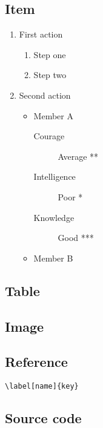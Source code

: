 \documentclass{article}
\begin{document}
\subsection{Item}
\begin{enumerate}
  \item First action
  \begin{enumerate}
    \item Step one
    \item Step two
  \end{enumerate}
  \item Second action
  \begin{itemize}
    \item Member A
    \begin{description}
      \item[Courage] Average **
      \item[Intelligence] Poor *
      \item[Knowledge] Good ***
    \end{description}
    \item Member B
  \end{itemize}
\end{enumerate}

\subsection{Table}
\subsection{Image}
\subsection{Reference}
\verb|\label[name]{key}|

\subsection{Source code}
\end{document}
